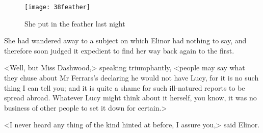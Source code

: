 \begin{letter}
	\begin{figure}[tbph]
		\centering
		\texttt{[image: 38feather]}
		\caption{She put in the feather last night}
	\end{figure}
\end{letter}


She had wandered away to a subject on which Elinor had nothing to say, and therefore soon judged it expedient to find her way back again to the first.

<Well, but Miss Dashwood,> speaking triumphantly, <people may say what they chuse about Mr Ferrars's declaring he would not have Lucy, for it is no such thing I can tell you; and it is quite a shame for such ill-natured reports to be spread abroad. Whatever Lucy might think about it herself, you know, it was no business of other people to set it down for certain.>

<I never heard any thing of the kind hinted at before, I assure you,> said Elinor.

